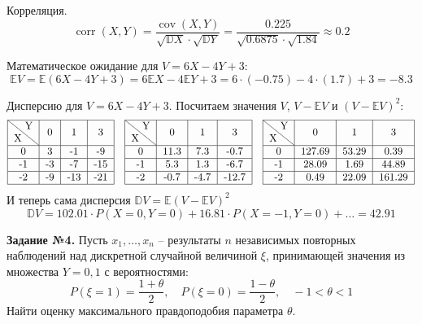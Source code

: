 \documentclass[a4paper, 12pt]{article}
\DeclareMathOperator{\cov}{cov}
\DeclareMathOperator{\corr}{corr}
\begin{document}
{Корреляция.
\[
    \corr(X, Y) = \frac{\cov(X, Y)}{\sqrt{\mathbb{D}X} \cdot \sqrt{\mathbb{D}Y}} = \frac{0.225}{\sqrt{0.6875} \cdot \sqrt{1.84}} \approx 0.2 
\]

Математическое ожидание для $V = 6X - 4Y + 3$:
\[
    \mathbb{E}V = \mathbb{E}(6X - 4Y + 3) = 6\mathbb{E}X - 4\mathbb{E}Y + 3 = 6 \cdot (-0.75) - 4 \cdot (1.7) + 3 = -8.3
\]

Дисперсию для $V = 6X - 4Y + 3$. Посчитаем значения $V$, $V - \mathbb{E}V$ и $(V - \mathbb{E}V)^2$:
\[
    \begin{tabular}{|c|c|c|c|}
        \hline 
         \diagbox[width=3em]{X}{Y} & 0 & 1 & 3 \\
         \hline  
         0 & 3 & -1 & -9 \\ 
         \hline
         -1 & -3 & -7 & -15 \\ 
         \hline
         -2 & -9 & -13 & -21 \\
         \hline 
    \end{tabular} \quad
    \begin{tabular}{|c|c|c|c|}
        \hline 
         \diagbox[width=3em]{X}{Y} & 0 & 1 & 3 \\
         \hline  
         0 & 11.3 & 7.3 & -0.7 \\ 
         \hline
         -1 & 5.3 & 1.3 & -6.7 \\ 
         \hline
         -2 & -0.7 & -4.7 & -12.7 \\
         \hline 
    \end{tabular} \quad 
    \begin{tabular}{|c|c|c|c|}
        \hline 
         \diagbox[width=3em]{X}{Y} & 0 & 1 & 3 \\
         \hline  
         0 & 127.69 & 53.29 & 0.39 \\ 
         \hline
         -1 & 28.09 & 1.69 & 44.89 \\ 
         \hline
         -2 & 0.49 & 22.09 & 161.29 \\
         \hline 
    \end{tabular}
\]
И теперь сама дисперсия $\mathbb{D}V = \mathbb{E}(V - \mathbb{E}V)^2$
\[
    \mathbb{D}V = 102.01 \cdot P(X = 0, Y = 0) + 16.81 \cdot P(X = -1, Y = 0) + \dots = 42.91
\]

\newpage

\textbf{Задание №4.} Пусть $x_1, \dots, x_n$ -- результаты $n$ независимых повторных наблюдений над дискретной случайной величиной $\xi$, принимающей значения из множества $Y = {0, 1}$ с вероятностями:
\[
    P(\xi = 1) = \frac{1 + \theta}{2}, \quad P(\xi = 0) = \frac{1 - \theta}{2}, \quad -1 < \theta < 1
\]
Найти оценку максимального правдоподобия параметра $\theta$.

}
\end{document}

